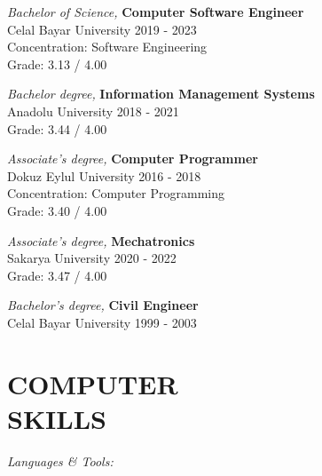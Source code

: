 \documentclass[line,margin]{res}
\begin{document}
\begin{resume}
                {\sl Bachelor of Science,} \textbf{Computer Software Engineer} \\
                Celal Bayar University 
                2019 - 2023 \\
                Concentration: Software Engineering \\
                Grade: 3.13 / 4.00 
                
                {\sl Bachelor degree,} \textbf{Information Management Systems} \\
                Anadolu University 
                2018 - 2021 \\
                Grade: 3.44 / 4.00 

                {\sl Associate's degree,} \textbf{Computer Programmer} \\
                Dokuz Eylul University 
                2016 - 2018 \\
                Concentration: Computer Programming \\
                Grade: 3.40 / 4.00 
 
                {\sl Associate's degree,} \textbf{Mechatronics} \\
                Sakarya University 
                2020 - 2022 \\
                Grade: 3.47 / 4.00 

                {\sl Bachelor's degree,} \textbf{Civil Engineer} \\
                Celal Bayar University 
                1999 - 2003 \\
\section{COMPUTER \\ SKILLS} {\sl Languages \& Tools:} \\
                

\end{resume}
\end{document}
